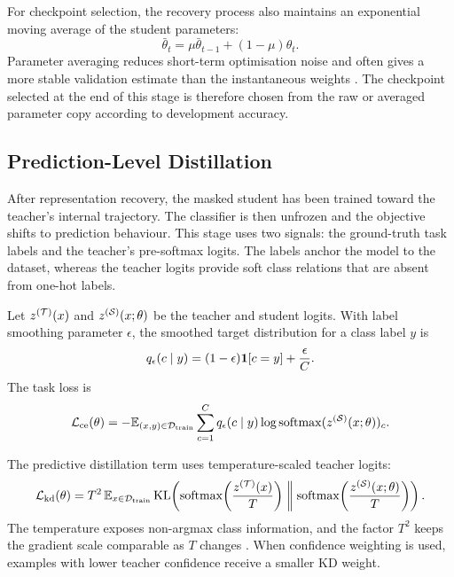 For checkpoint selection, the recovery process also maintains an exponential moving average of the student parameters:
\begin{equation}
\bar{\theta}_t
=
\mu\bar{\theta}_{t-1}
+
(1-\mu)\theta_t .
\label{eq:recovery_ema}
\end{equation}
Parameter averaging reduces short-term optimisation noise and often gives a more stable validation estimate than the instantaneous weights \citep{polyak1992acceleration}. The checkpoint selected at the end of this stage is therefore chosen from the raw or averaged parameter copy according to development accuracy.

\subsection{Prediction-Level Distillation}
\label{chap:recovery_2d}

After representation recovery, the masked student has been trained toward the teacher's internal trajectory. The classifier is then unfrozen and the objective shifts to prediction behaviour. This stage uses two signals: the ground-truth task labels and the teacher's pre-softmax logits. The labels anchor the model to the dataset, whereas the teacher logits provide soft class relations that are absent from one-hot labels.

Let $z^{(\mathcal{T})}(x)$ and $z^{(\mathcal{S})}(x;\theta)$ be the teacher and student logits. With label smoothing parameter $\epsilon$, the smoothed target distribution for a class label $y$ is
\[
q_\epsilon(c\mid y)
=
(1-\epsilon)\mathbf{1}[c=y]+\frac{\epsilon}{C}.
\]
The task loss is
\begin{equation}
\mathcal{L}_{\mathrm{ce}}(\theta)
=
-
\mathbb{E}_{(x,y)\in\mathcal{D}_{\mathrm{train}}}
\sum_{c=1}^{C}
q_\epsilon(c\mid y)
\log \operatorname{softmax}(z^{(\mathcal{S})}(x;\theta))_c .
\label{eq:recovery_ce_loss}
\end{equation}

The predictive distillation term uses temperature-scaled teacher logits:
\begin{equation}
\mathcal{L}_{\mathrm{kd}}(\theta)
=
T^2\,
\mathbb{E}_{x\in\mathcal{D}_{\mathrm{train}}}
\operatorname{KL}\!\left(
\operatorname{softmax}\!\left(\frac{z^{(\mathcal{T})}(x)}{T}\right)
\;\middle\|\;
\operatorname{softmax}\!\left(\frac{z^{(\mathcal{S})}(x;\theta)}{T}\right)
\right).
\label{eq:recovery_kd_loss}
\end{equation}
The temperature exposes non-argmax class information, and the factor $T^2$ keeps the gradient scale comparable as $T$ changes \citep{hinton2015distilling}. When confidence weighting is used, examples with lower teacher confidence receive a smaller KD weight.

